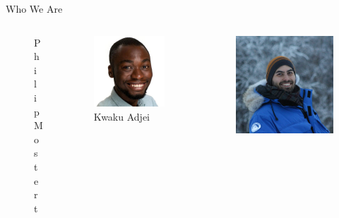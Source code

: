 \documentclass[
  ignorenonframetext,
]{beamer}
\begin{document}
\begin{frame}
\begin{block}{Who We Are}
\begin{columns}[T]
\begin{column}{0.25\textwidth}
\begin{figure}[H]
{}

\caption{Philip Mostert}

\end{figure}%
\end{column}

\begin{column}{0.25\textwidth}
\begin{figure}[H]

{\centering \includegraphics{Images/Kwaku.jpg}

}

\caption{Kwaku Adjei}

\end{figure}%
\end{column}

\begin{column}{0.25\textwidth}
\begin{figure}[H]

{\centering \includegraphics{Images/RonT.jpg}

}
\end{figure}
\end{column}
\end{columns}
\end{block}
\end{frame}
\end{document}
